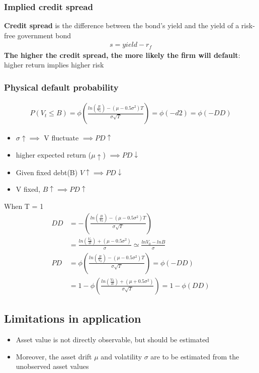 \documentclass{article}
\theoremstyle{definition}
\theoremstyle{thrm}
\theoremstyle{lma}
\theoremstyle{ppst}
\theoremstyle{crlr}
\begin{document}
\subsubsection{Implied credit spread}
\textbf{Credit spread} is the difference between the bond's yield and the yield of a risk-free government bond
\begin{align*}
	s = yield - r_f
\end{align*}
\textbf{The higher the credit spread, the more likely the firm will default}: higher return implies higher risk
\subsubsection{Physical default probability}
\begin{align*}
	P(V_t\leq B) = \phi (\frac{ln(\frac{B}{V_0}) - (\mu - 0.5\sigma^2)T}{\sigma\sqrt{T}}) = \phi(-d2) = \phi(-DD)
\end{align*}
\begin{itemize}

	\item $\sigma \uparrow \implies$ V fluctuate $\implies PD \uparrow$
	\item higher expected return ($\mu \uparrow$) $\implies PD \downarrow$
	\item Given fixed debt(B) $V \uparrow \implies PD \downarrow$
	\item V fixed, $B\uparrow \implies PD\uparrow$
\end{itemize}
When T = 1
\begin{align*}
	DD &= -(\frac{ln(\frac{B}{V_0})-(\mu - 0.5\sigma^2)T}{\sigma\sqrt{T}})\\
	&= \frac{ln(\frac{V_0}{B}) + (\mu - 0.5\sigma^2)}{\sigma} \simeq \frac{lnV_0-lnB}{\sigma}\\
	PD &= \phi (\frac{ln(\frac{B}{V_0}) - (\mu - 0.5\sigma^2)T}{\sigma\sqrt{T}}) = \phi(-DD)\\
	&= 1-\phi(\frac{ln(\frac{V_0}{B})+(\mu+0.5\sigma^2)}{\sigma\sqrt{T}}) = 1-\phi(DD)
\end{align*}
\subsection{Limitations in application}
\begin{itemize}
	\item Asset value is not directly observable, but should be estimated
	\item Moreover, the asset drift $\mu$ and volatility $\sigma$ are to be estimated from the unobserved asset values
\end{itemize}
\end{document}
